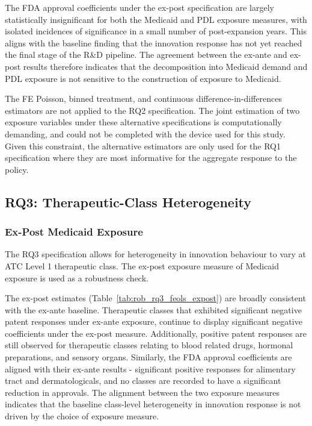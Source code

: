 \documentclass[12pt]{article}
\begin{document}
The FDA approval coefficients under the ex-post specification are largely statistically insignificant for both the Medicaid and PDL exposure measures, with isolated incidences of significance in a small number of post-expansion years. This aligns with the baseline finding that the innovation response has not yet reached the final stage of the R\&D pipeline. The agreement between the ex-ante and ex-post results therefore indicates that the decomposition into Medicaid demand and PDL exposure is not sensitive to the construction of exposure to Medicaid.

The FE Poisson, binned treatment, and continuous difference-in-differences estimators are not applied to the RQ2 specification. The joint estimation of two exposure variables under these alternative specifications is computationally demanding, and could not be completed with the device used for this study. Given this constraint, the alternative estimators are only used for the RQ1 specification where they are most informative for the aggregate response to the policy.

\subsection{RQ3: Therapeutic-Class Heterogeneity}

\subsubsection{Ex-Post Medicaid Exposure}

The RQ3 specification allows for heterogeneity in innovation behaviour to vary at ATC Level 1 therapeutic class. The ex-post exposure measure of Medicaid exposure is used as a robustness check.

The ex-post estimates (Table~\ref{tab:rob_rq3_feols_expost}) are broadly consistent with the ex-ante baseline. Therapeutic classes that exhibited significant negative patent responses under ex-ante exposure, continue to display significant negative coefficients under the ex-post measure. Additionally, positive patent responses are still observed for therapeutic classes relating to blood related drugs, hormonal preparations, and sensory organs. Similarly, the FDA approval coefficients are aligned with their ex-ante results - significant positive responses for alimentary tract and dermatologicals, and no classes are recorded to have a significant reduction in approvals. The alignment between the two exposure measures indicates that the baseline class-level heterogeneity in innovation response is not driven by the choice of exposure measure.
\end{document}
